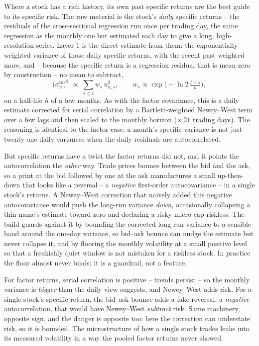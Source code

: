\documentclass[11pt]{article}
\theoremstyle{definition}
\theoremstyle{plain}
\theoremstyle{remark}
\begin{document}
Where a stock has a rich history, its own past specific returns are the best guide to its specific risk. The raw material is the stock's \emph{daily} specific returns -- the residuals of the cross-sectional regression run once per trading day, the same regression as the monthly one but estimated each day to give a long, high-resolution series. Layer 1 is the direct estimate from them: the exponentially-weighted variance of those daily specific returns, with the recent past weighted more, and -- because the specific return is a regression residual that is mean-zero by construction -- no mean to subtract,
\[
\big(\sigma^{\text{ts}}_n\big)^2 \;\propto\; \sum_{s\le t} w_s\,u_{n,s}^2 ,
\qquad
w_s \propto \exp\!\Big(-\ln 2\,\tfrac{t-s}{h}\Big),
\]
on a half-life $h$ of a few months. As with the factor covariance, this is a daily estimate corrected for serial correlation by a Bartlett-weighted Newey--West term over a few lags and then scaled to the monthly horizon ($\times\,21$ trading days). The reasoning is identical to the factor case: a month's specific variance is not just twenty-one daily variances when the daily residuals are autocorrelated.

But specific returns have a twist the factor returns did not, and it points the autocorrelation the \emph{other} way. Trade prices bounce between the bid and the ask, so a print at the bid followed by one at the ask manufactures a small up-then-down that looks like a reversal -- a \emph{negative} first-order autocovariance -- in a single stock's returns. A Newey--West correction that naively added this negative autocovariance would push the long-run variance \emph{down}, occasionally collapsing a thin name's estimate toward zero and declaring a risky micro-cap riskless. The build guards against it by bounding the corrected long-run variance to a sensible band around the one-day variance, so bid--ask bounce can nudge the estimate but never collapse it, and by flooring the monthly volatility at a small positive level so that a freakishly quiet window is not mistaken for a riskless stock. In practice the floor almost never binds; it is a guardrail, not a feature.

\begin{intuition}
For factor returns, serial correlation is positive -- trends persist -- so the monthly variance is \emph{bigger} than the daily view suggests, and Newey--West adds risk. For a single stock's specific return, the bid--ask bounce adds a fake reversal, a \emph{negative} autocorrelation, that would have Newey--West \emph{subtract} risk. Same machinery, opposite sign, and the danger is opposite too: here the correction can understate risk, so it is bounded. The microstructure of how a single stock trades leaks into its measured volatility in a way the pooled factor returns never showed.
\end{intuition}
\end{document}
